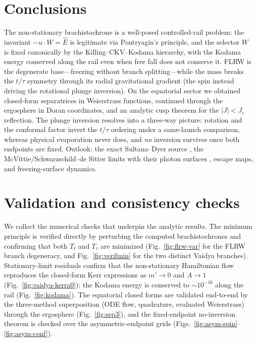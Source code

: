 \documentclass[
    aps, prd, twocolumn, superscriptaddress,
    showpacs, nofootinbib, floatfix
]{revtex4-2}
\newcommand{\Ehat}{\hat E}
\newcommand{\Jc}{J_{c}}
\begin{document}
\section{Conclusions}
\label{sec:concl}
The non-stationary brachistochrone is a well-posed controlled-rail problem: the
invariant $-u\cdot W=\Ehat$ is legitimate via Pontryagin's principle, and the
selector $W$ is fixed canonically by the Killing--CKV--Kodama hierarchy, with
the Kodama energy conserved along the rail even when free fall does not conserve
it. FLRW is the degenerate base---freezing without branch splitting---while the
mass breaks the $t/\tau$ symmetry through its radial gravitational gradient (the
spin instead driving the rotational plunge inversion). On
the equatorial sector we obtained closed-form separatrices in Weierstrass
functions, continued through the ergosphere in Doran coordinates, and an analytic
cusp theorem for the $|J|<\Jc$ reflection. The plunge inversion resolves into a
three-way picture: rotation and the conformal factor invert the $t/\tau$
ordering under a same-launch comparison, whereas physical evaporation never does,
and \emph{no} inversion survives once both endpoints are fixed. Outlook: the
exact Sultana--Dyer source
\cite{SultanaDyer2005}, the McVittie/Schwarzschild--de Sitter limits
\cite{McVittie1933,Kottler1918,Kaloper2010} with their photon surfaces
\cite{ClaudelViracVirbhadra2001}, escape maps, and freezing-surface dynamics.


\clearpage
\appendix
\section{Validation and consistency checks}
\label{app:validation}
We collect the numerical checks that underpin the analytic results. The
minimum principle is verified directly by perturbing the computed
brachistochrones and confirming that both $T_t$ and $T_\tau$ are minimized
(Fig.~\ref{fig:flrw-var} for the FLRW branch degeneracy, and
Fig.~\ref{fig:verifmin} for the two distinct Vaidya branches). Stationary-limit
residuals confirm that the non-stationary
Hamiltonian flow reproduces the closed-form Kerr expressions as $m'\to0$ and
$A\to1$ (Fig.~\ref{fig:vaidya-kerra0}); the Kodama energy is conserved to
$\sim10^{-16}$ along the rail (Fig.~\ref{fig:kodama}). The equatorial closed
forms are validated end-to-end by the three-method superposition
(ODE flow, quadrature, evaluated Weierstrass) through the ergosphere
(Fig.~\ref{fig:sep3}), and the fixed-endpoint no-inversion theorem is
checked over the asymmetric-endpoint grids (Figs.~\ref{fig:asym-spin}--%
\ref{fig:asym-conf}).
\end{document}
